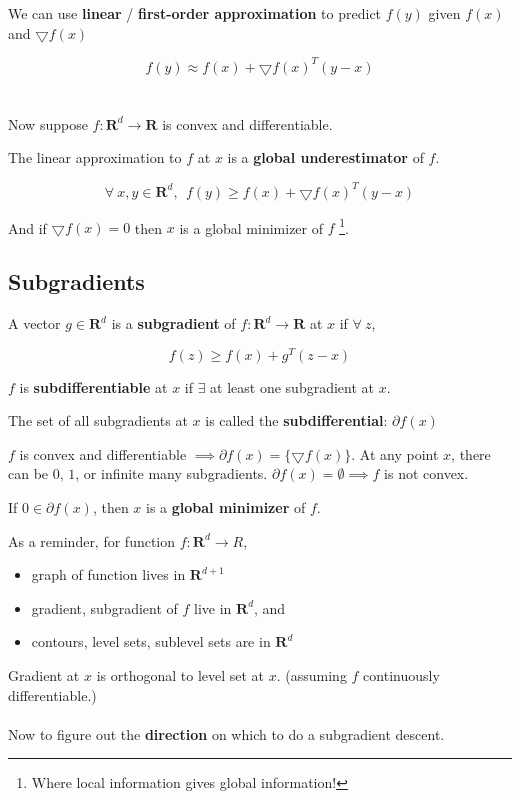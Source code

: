 \documentclass{article}
\begin{document}
We can use \textbf{linear} / \textbf{first-order approximation} to predict $f(y)$ given $f(x)$ and $\bigtriangledown f(x)$

$$
f(y) \approx f(x) + \bigtriangledown f(x)^{T} (y - x)
$$
\\
\\
Now suppose $f : \mathbf{R}^d \to \mathbf{R}$ is convex and differentiable.

The linear approximation to $f$ at $x$ is a \textbf{global underestimator} of $f$.

$$
\forall ~ x, y \in \mathbf{R}^d, ~ ~ f(y) \geq f(x) + \bigtriangledown f(x)^{T} (y - x)
$$

And if $\bigtriangledown f(x) = 0$ then $x$ is a global minimizer of $f$ \footnote{Where local information gives global information!}.

\subsection{Subgradients}

A vector $g \in \mathbf{R}^d$ is a \textbf{subgradient} of $f : \mathbf{R}^d \to \mathbf{R}$ at $x$ if $\forall ~ z$,

$$
f(z) \geq f(x) + g^{T} (z - x)
$$

$f$ is \textbf{subdifferentiable} at $x$ if $\exists$ at least one subgradient at $x$.

The set of all subgradients at $x$ is called the \textbf{subdifferential}: $\partial f(x)$

$f$ is convex and differentiable $\implies \partial f(x) = \{ \bigtriangledown f(x) \}$.
At any point $x$, there can be $0$, $1$, or infinite many subgradients.
$\partial f(x) = \emptyset \implies f$ is not convex.

If $0 \in \partial f(x)$, then $x$ is a \textbf{global minimizer} of $f$.

As a reminder, for function $f : \mathbf{R}^d \to R$,
\begin{itemize}
  \item graph of function lives in $\mathbf{R}^{d + 1}$
  \item gradient, subgradient of $f$ live in $\mathbf{R}^d$, and
  \item contours, level sets, sublevel sets are in $\mathbf{R}^d$
\end{itemize}

Gradient at $x$ is orthogonal to level set at $x$. (assuming $f$ continuously differentiable.)
\\
\\
Now to figure out the \textbf{direction} on which to do a subgradient descent.
\end{document}
